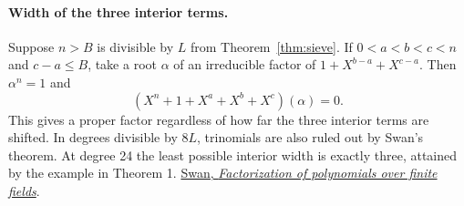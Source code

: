\documentclass[11pt]{article}
\begin{document}
\paragraph{Width of the three interior terms.}
Suppose \(n>B\) is divisible by \(L\) from Theorem~\ref{thm:sieve}. If
\(0<a<b<c<n\) and \(c-a\le B\), take a root \(\alpha\) of an irreducible
factor of \(1+X^{b-a}+X^{c-a}\). Then \(\alpha^n=1\) and
\[
 (X^n+1+X^a+X^b+X^c)(\alpha)=0.
\]
This gives a proper factor regardless of how far the three interior terms are
shifted. In degrees divisible by \(8L\), trinomials are also ruled out by Swan's
theorem. At degree 24 the least possible interior width is exactly three,
attained by the example in Theorem 1.
\href{https://msp.org/pjm/1962/12-3/pjm-v12-n3-p27-p.pdf}{Swan, \emph{Factorization of polynomials over finite fields}}.
\end{document}
